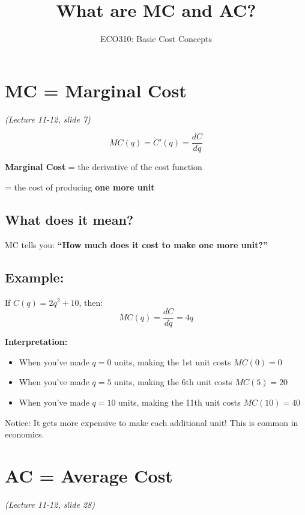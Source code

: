 \documentclass[11pt]{article}
\title{\textbf{What are MC and AC?}}
\author{ECO310: Basic Cost Concepts}
\date{}
\begin{document}
\maketitle

\section{MC = Marginal Cost}
\textit{(Lecture 11-12, slide 7)}

\begin{tcolorbox}[colback=boxblue, colframe=blue!50!black, title=Definition:]
\Large
\[
MC(q) = C'(q) = \frac{dC}{dq}
\]

\normalsize
\textbf{Marginal Cost} = the derivative of the cost function

= the cost of producing \textbf{one more unit}
\end{tcolorbox}

\subsection*{What does it mean?}

MC tells you: \textbf{``How much does it cost to make one more unit?''}

\subsection*{Example:}

If $C(q) = 2q^2 + 10$, then:
\[
MC(q) = \frac{dC}{dq} = 4q
\]

\textbf{Interpretation:}
\begin{itemize}[leftmargin=*]
    \item When you've made $q=0$ units, making the 1st unit costs $MC(0) = 0$
    \item When you've made $q=5$ units, making the 6th unit costs $MC(5) = 20$
    \item When you've made $q=10$ units, making the 11th unit costs $MC(10) = 40$
\end{itemize}

Notice: It gets more expensive to make each additional unit! This is common in economics.

\newpage

\section{AC = Average Cost}
\textit{(Lecture 11-12, slide 28)}
\end{document}
